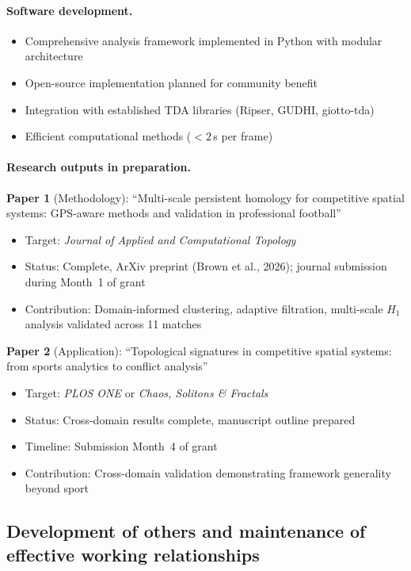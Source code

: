 \paragraph{Software development.}
\begin{itemize}
  \item Comprehensive analysis framework implemented in Python with modular architecture
  \item Open-source implementation planned for community benefit
  \item Integration with established TDA libraries (Ripser, GUDHI, giotto-tda)
  \item Efficient computational methods (${<}2$\,s per frame)
\end{itemize}

\paragraph{Research outputs in preparation.}

\textbf{Paper 1} (Methodology): ``Multi-scale persistent homology for competitive spatial systems: GPS-aware methods and validation in professional football''
\begin{itemize}[nosep]
  \item Target: \emph{Journal of Applied and Computational Topology}
  \item Status: Complete, ArXiv preprint (Brown et al., 2026); journal submission during Month~1 of grant
  \item Contribution: Domain-informed clustering, adaptive filtration, multi-scale $H_1$ analysis validated across 11 matches
\end{itemize}

\textbf{Paper 2} (Application): ``Topological signatures in competitive spatial systems: from sports analytics to conflict analysis''
\begin{itemize}[nosep]
  \item Target: \emph{PLOS ONE} or \emph{Chaos, Solitons \& Fractals}
  \item Status: Cross-domain results complete, manuscript outline prepared
  \item Timeline: Submission Month~4 of grant
  \item Contribution: Cross-domain validation demonstrating framework generality beyond sport
\end{itemize}

\subsection{Development of others and maintenance of effective working relationships}

